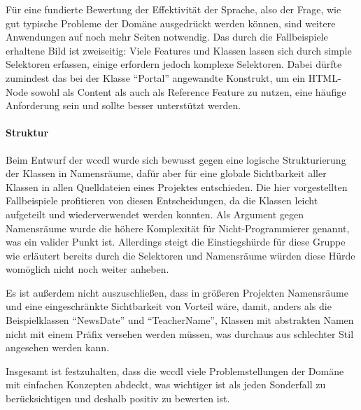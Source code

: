     Für eine fundierte Bewertung der Effektivität der Sprache,
    also der Frage, wie gut typische Probleme der Domäne ausgedrückt werden können,
    sind weitere Anwendungen auf noch mehr Seiten notwendig.
    Das durch die Fallbeispiele erhaltene Bild ist zweiseitig:
    Viele Features und Klassen lassen sich durch simple Selektoren erfassen,
    einige erfordern jedoch komplexe Selektoren.
    Dabei dürfte zumindest das bei der Klasse "`Portal"' angewandte Konstrukt,
    um ein HTML-Node sowohl als Content als auch als Reference Feature zu nutzen,
    eine häufige Anforderung sein und sollte besser unterstützt werden.

    \paragraph{Struktur}
    Beim Entwurf der \gls{wccdl} wurde sich bewusst gegen
    eine logische Strukturierung der Klassen in Namensräume,
    dafür aber für eine globale Sichtbarkeit aller Klassen
    in allen Quelldateien eines Projektes entschieden.
    Die hier vorgestellten Fallbeispiele profitieren von diesen Entscheidungen,
    da die Klassen leicht aufgeteilt und wiederverwendet werden konnten.
    Als Argument gegen Namensräume wurde die höhere Komplexität für
    Nicht-Programmierer genannt, was ein valider Punkt ist.
    Allerdings steigt die Einstiegshürde für diese Gruppe wie erläutert bereits
    durch die Selektoren und Namensräume würden diese Hürde womöglich nicht noch weiter anheben.

    Es ist außerdem nicht auszuschließen, dass in größeren Projekten
    Namensräume und eine eingeschränkte Sichtbarkeit von Vorteil wäre,
    damit, anders als die Beispielklassen "`NewsDate"' und "`TeacherName"',
    Klassen mit abstrakten Namen nicht mit einem Präfix versehen werden müssen,
    was durchaus aus schlechter Stil angesehen werden kann.

    Insgesamt ist festzuhalten, dass die \gls{wccdl} viele Problemstellungen der Domäne
    mit einfachen Konzepten abdeckt, was wichtiger ist als jeden Sonderfall zu berücksichtigen
    und deshalb positiv zu bewerten ist.